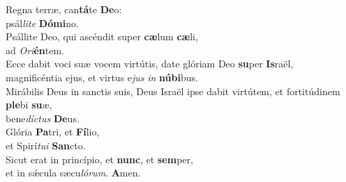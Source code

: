 \oddverse Regna terræ, can\textbf{tá}te \textbf{De}o:~\*\\
\oddverse psál\textit{li}\textit{te} \textbf{Dó}\textbf{mi}no.\\
\evenverse Psállite Deo, qui ascéndit super \textbf{cæ}lum \textbf{cæ}li,~\*\\
\evenverse ad \textit{O}\textit{ri}\textbf{én}tem.\\
\oddverse Ecce dabit voci suæ vocem virtútis, date glóriam Deo \textbf{su}per \textbf{Is}raël,~\*\\
\oddverse magnificéntia ejus, et virtus e\textit{jus} \textit{in} \textbf{nú}\textbf{bi}bus.\\
\evenverse Mirábilis Deus in sanctis suis, Deus Israël ipse dabit virtútem, et fortitúdinem \textbf{ple}bi \textbf{su}æ,~\*\\
\evenverse bene\textit{dí}\textit{ctus} \textbf{De}us.\\
\oddverse Glória \textbf{Pa}tri, et \textbf{Fí}lio,~\*\\
\oddverse et Spirí\textit{tu}\textit{i} \textbf{San}cto.\\
\evenverse Sicut erat in princípio, et \textbf{nunc}, et \textbf{sem}per,~\*\\
\evenverse et in sǽcula sæcu\textit{ló}\textit{rum}. \textbf{A}men.\\
